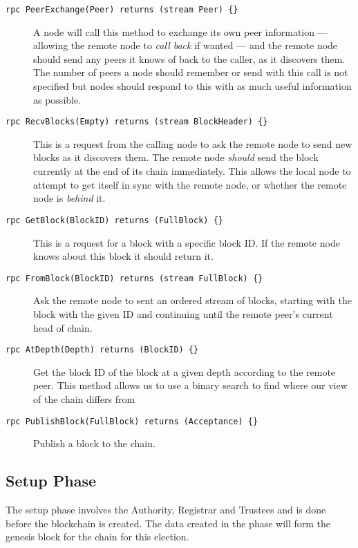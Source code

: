 \begin{description}
    \item[\texttt{rpc PeerExchange(Peer) returns (stream Peer) \{\}}] A node will call this method to exchange its own peer information --- allowing the remote node to \emph{call back} if wanted --- and the remote node should send any peers it knows of back to the caller, as it discovers them. The number of peers a node should remember or send with this call is not specified but nodes should respond to this with as much useful information as possible.
    \item[\texttt{rpc RecvBlocks(Empty) returns (stream BlockHeader) \{\}}] This is a request from the calling node to ask the remote node to send new blocks as it discovers them. The remote node \emph{should} send the block currently at the end of its chain immediately. This allows the local node to attempt to get itself in sync with the remote node, or whether the remote node is \emph{behind} it.
    \item[\texttt{rpc GetBlock(BlockID) returns (FullBlock) \{\}}] This is a request for a block with a specific block ID. If the remote node knows about this block it should return it.
    \item[\texttt{rpc FromBlock(BlockID) returns (stream FullBlock) \{\}}] Ask the remote node to sent an ordered stream of blocks, starting with the block with the given ID and continuing until the remote peer's current head of chain.
    \item[\texttt{rpc AtDepth(Depth) returns (BlockID) \{\}}] Get the block ID of the block at a given depth according to the remote peer. This method allows us to use a binary search to find where our view of the chain differs from
    \item[\texttt{rpc PublishBlock(FullBlock) returns (Acceptance) \{\}}] Publish a block to the chain.
\end{description}


\subsection{Setup Phase}
\label{ch:astris:detail:setup}

The setup phase involves the Authority, Registrar and Trustees and is done before the blockchain is created. The data created in the phase will form the genesis block for the chain for this election.

